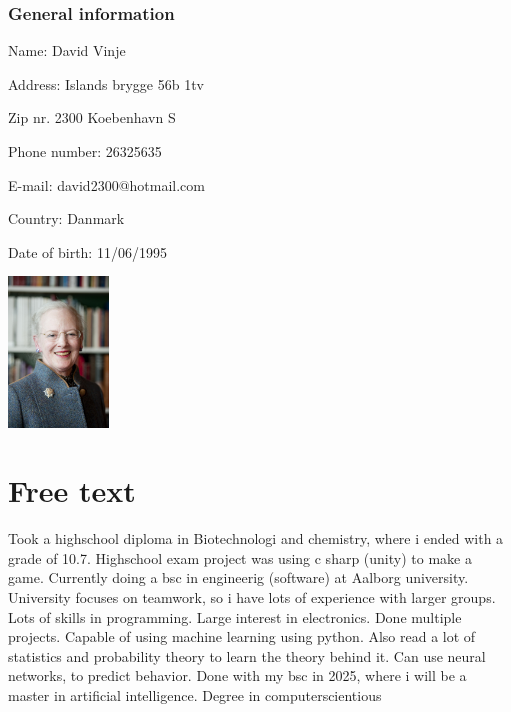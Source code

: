 \begin{minipage}[b]{0.45\textwidth} 
\subsubsection*{General information}
 Name: David Vinje 

 Address: Islands brygge 56b 1tv 

 Zip nr. 2300 Koebenhavn S 

 Phone number: 26325635 

 E-mail: david2300@hotmail.com 

 Country: Danmark 

 Date of birth: 11/06/1995 
 \end{minipage}
 \hfill
\begin{minipage}[b]{3cm} \includegraphics[height=4cm]{figures/1200px-Drottning_Margrethe_av_Danmark} \end{minipage}

\section*{Free text}
Took a highschool diploma in Biotechnologi and chemistry, where i ended with a grade of 10.7.
Highschool exam project was using c sharp (unity) to make a game.
Currently doing a bsc in engineerig (software) at Aalborg university.
University focuses on teamwork, so i have lots of experience with larger groups.
Lots of skills in programming.
Large interest in electronics. Done multiple projects.
Capable of using machine learning using python. Also read a lot of statistics and probability theory to learn the theory behind it. Can use neural networks, to predict behavior.
Done with my bsc in 2025, where i will be a master in artificial intelligence.
Degree in computerscientious

